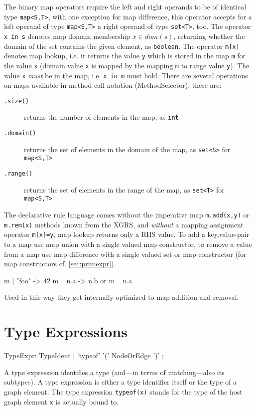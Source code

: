 The binary map operators require the left and right operands to be of identical type \verb#map<S,T>#,
with one exception for map difference, this operator accepts for a left operand of type \verb#map<S,T># a right operand of type \verb#set<T>#, too.
The operator \texttt{x in s} denotes map domain membership $x \in dom(s)$, returning whether the domain of the set contains the given element, as \texttt{boolean}.
The operator \texttt{m[x]} denotes map lookup, i.e. it returns the value \texttt{y} which is stored in the map \texttt{m} for the value \texttt{x} (domain value \texttt{x} is mapped by the mapping \texttt{m} to range value \texttt{y}). The value \texttt{x} \emph{must} be in the map, i.e. \texttt{x in m} must hold.
There are several operations on maps available in method call notation (MethodSelector), these are:

\begin{description}
\item[\texttt{.size()}] returns the number of elements in the map, as \texttt{int}
\item[\texttt{.domain()}] returns the set of elements in the domain of the map, as \verb#set<S># for \verb#map<S,T>#
\item[\texttt{.range()}] returns the set of elements in the range of the map, as \verb#set<T># for \verb#map<S,T>#
\end{description}

\begin{note}
The declarative rule language comes without the imperative map \texttt{m.add(x,y)} or \texttt{m.rem(x)} methods known from the XGRS,
and \emph{without} a mapping assignment operator \texttt{m[x]=y}, map lookup returns only a RHS value.
To add a key,value-pair to a map use map union with a single valued map constructor,
to remove a value from a map use map difference with a single valued set or map constructor (for map constructors cf. \ref{sec:primexpr}).
\begin{grgen}
m | { "foo" -> 42 }
m \ { n.a -> n.b } or m \ { n.a } 
\end{grgen}
Used in this way they get internally optimized to map addition and removal.
\end{note}


\section{Type Expressions}
\label{typeexpressions}

\begin{rail}
  TypeExpr: TypeIdent | 'typeof' '(' NodeOrEdge ')' ;
\end{rail}
A type expression identifies a type (and---in terms of matching---also its subtypes).
A type expression is either a type identifier itself or the type of a graph element.
The type expression \texttt{typeof(x)} stands for the type of the host graph element \texttt{x} is actually bound to.

